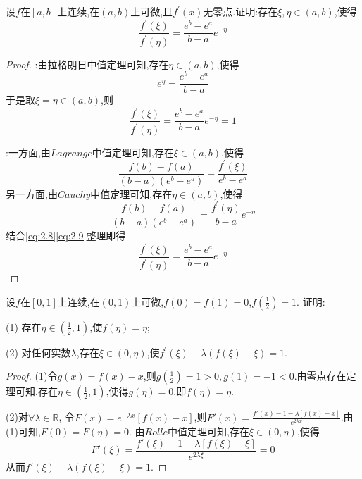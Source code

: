 \documentclass[lang=cn,newtx,10pt,scheme=chinese]{elegantbook}
\begin{document}
\begin{exercise}
    设\(f\)在\([a,b]\)上连续,在\((a,b)\)上可微,且\(f^{\prime}(x)\)无零点.证明:存在\(\xi,\eta\in(a,b)\),使得
    \begin{equation}
        \frac{f^{\prime}(\xi)}{f^{\prime}(\eta)}=\frac{e^{b}-e^{a}}{b - a}e^{-\eta}
    \nonumber
    \end{equation}
    \begin{proof}
        {\color{blue} }:由拉格朗日中值定理可知,存在$\eta\in(a,b)$,使得
    \begin{equation}
        e^{\eta}=\frac{e^b-e^a}{b-a}
        \nonumber
    \end{equation}
    于是取$\xi=\eta\in(a,b)$,则
    \begin{equation}
        \frac{f^{\prime}(\xi )}{f^{\prime}(\eta )}=\frac{e^b-e^a}{b-a}e^{-\eta}=1
        \nonumber
    \end{equation}

    {\color{blue} }:一方面,由$Lagrange$中值定理可知,存在$\xi \in(a,b)$,使得
    \begin{equation}\label{eq:2.8}
        \frac{f(b)-f\left( a \right)}{\left( b-a \right) \left( e^b-e^a \right)}=\frac{f^{\prime}(\xi )}{e^b-e^a}
    \end{equation}
    另一方面,由$Cauchy$中值定理可知,存在$\eta \in(a,b)$,使得
    \begin{equation}\label{eq:2.9}
        \frac{f(b)-f\left( a \right)}{\left( b-a \right) \left( e^b-e^a \right)}=\frac{f^{\prime}(\eta )}{b-a}e^{-\eta}
    \end{equation}
    结合\eqref{eq:2.8}\eqref{eq:2.9}整理即得
    \begin{equation}
        \frac{f^{\prime}(\xi )}{f^{\prime}(\eta )}=\frac{e^b-e^a}{b-a}e^{-\eta}
    \end{equation}
    \end{proof}
\end{exercise}

\begin{exercise}
    设\(f\)在\([0,1]\)上连续,在\((0,1)\)上可微,\(f(0)=f(1)=0\),\(f(\frac{1}{2})=1\).
    证明:
    
    (1) 存在\(\eta\in(\frac{1}{2},1)\),使\(f(\eta)=\eta\);
    
    (2) 对任何实数\(\lambda\),存在\(\xi\in(0,\eta)\),使\(f^{\prime}(\xi)-\lambda(f(\xi)-\xi)=1\).
    \begin{proof}
    (1)令$g(x)=f(x)-x$,则$g(\frac{1}{2})=1>0,g(1)=-1<0$.由零点存在定理可知,存在$\eta\in(\frac{1}{2},1)$,使得$g(\eta)=0$.即$f(\eta)=\eta$.

    (2)对$\forall \lambda\in \mathbb{R}$,
    令$F(x)=e^{-\lambda x}[f(x)-x]$,则$F'(x)=\frac{f'(x)-1-\lambda[f(x)-x]}{e^{2\lambda x}}$.由(1)可知,$F(0)=F(\eta)=0$.
    由$Rolle$中值定理可知,存在$\xi\in(0,\eta)$,使得
    \begin{equation}
    F'(\xi)=\frac{f'(\xi)-1-\lambda[f(\xi)-\xi]}{e^{2\lambda \xi}}=0
        \nonumber
    \end{equation}
    从而$f'(\xi)-\lambda(f(\xi)-\xi)=1$.
    \end{proof}
\end{exercise}
\end{document}
